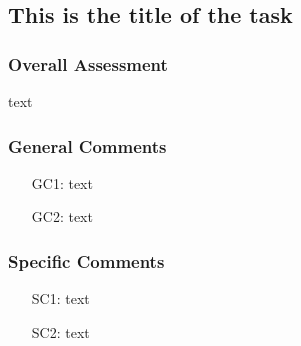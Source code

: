 \subsection{This is the title of the task}
\label{task:@label}

\subsubsection*{Overall Assessment}
text

\subsubsection*{General Comments}
\begin{itemize}
    \item[GC1:] text
    \item[GC2:] text
\end{itemize}

\subsubsection*{Specific Comments}
\begin{itemize}
    \item[SC1:] text
    \item[SC2:] text
\end{itemize}
